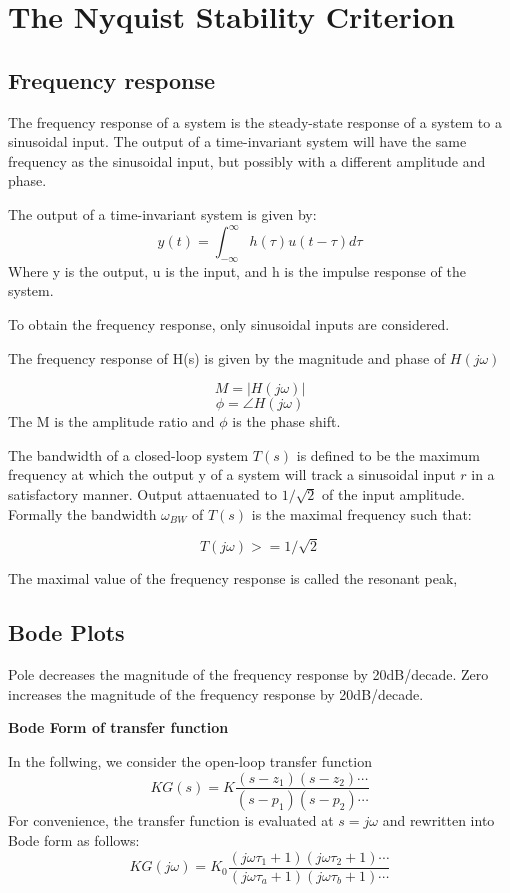 \section{The Nyquist Stability Criterion}

\subsection{Frequency response}
The frequency response of a system is the steady-state response of a system to a sinusoidal input.
The output of a time-invariant system will have the same frequency as the sinusoidal input,
but possibly with a different amplitude and phase.

The output of a time-invariant system is given by:
$$y(t) = \int_{-\infty}^{\infty} h(\tau)u(t-\tau)d\tau$$
Where y is the output, u  is the input, and h is the impulse response of the system.

To obtain the frequency response, only sinusoidal inputs are considered.

The frequency response of H(s) is given by the magnitude and phase of $H(j\omega)$

$$M = |H(j\omega)|$$
$$\phi = \angle H(j\omega)$$
The M is the amplitude ratio and $\phi$ is the phase shift.

The bandwidth of a closed-loop system $T(s)$ is defined to be the maximum frequency at which
the output y of a system will track a sinusoidal input $r$ in a satisfactory manner. Output attaenuated to $1/\sqrt{2}$ of the input amplitude.
Formally the bandwidth $\omega_{BW}$ of $T(s)$ is the maximal frequency such that:

$$T(j\omega) >= 1/\sqrt{2}$$

The maximal value of the frequency response is called the resonant peak,

\subsection{Bode Plots}
Pole decreases the magnitude of the frequency response by 20dB/decade.
Zero increases the magnitude of the frequency response by 20dB/decade.

\textbf{Bode Form of transfer function}

In the follwing, we consider the open-loop transfer function
$$KG(s) = K  \frac{(s-z_1)(s-z_2)\cdots}{(s-p_1)(s-p_2)\cdots}$$
For convenience, the transfer function is evaluated at $s = j\omega$ and rewritten into
Bode form as follows:
$$ KG(j\omega) = K_0 \frac{(j\omega \tau_1 +1)(j\omega \tau_2 +1)\cdots}{(j\omega \tau_a+1)(j\omega \tau_b +1)\cdots}$$

